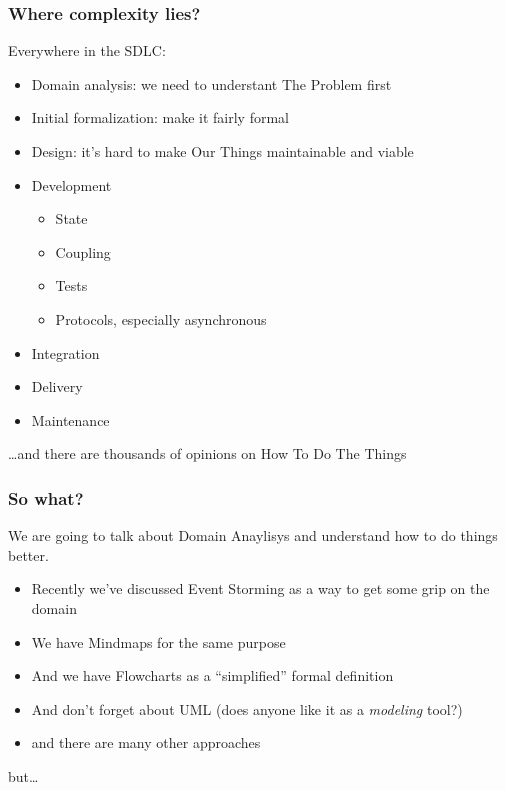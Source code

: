 \documentclass{beamer}
\begin{document}
\begin{frame}
    \frametitle{Where complexity lies?}

    Everywhere in the SDLC:
    \begin{itemize}
        \item Domain analysis: we need to understant The Problem first
        \item Initial formalization: make it fairly formal
        \item Design: it's hard to make Our Things maintainable and viable
        \item Development
        \begin{itemize}
            \item State
            \item Coupling
            \item Tests
            \item Protocols, especially asynchronous
        \end{itemize}     
        \item Integration
        \item Delivery
        \item Maintenance
    \end{itemize}

\dots and there are thousands of opinions on How To Do The Things

\end{frame}

\begin{frame}
    \frametitle{So what?}

    We are going to talk about Domain Anaylisys and understand how to 
    do things better.

    \begin{itemize}
        \item Recently we've discussed Event Storming as a way to get some grip on the domain
        \item We have Mindmaps for the same purpose
        \item And we have Flowcharts as a ``simplified'' formal definition
        \item And don't forget about UML (does anyone like it as a \textit{modeling} tool?)
        \item and there are many other approaches
    \end{itemize}
    

    but\dots
\end{frame}
\end{document}

